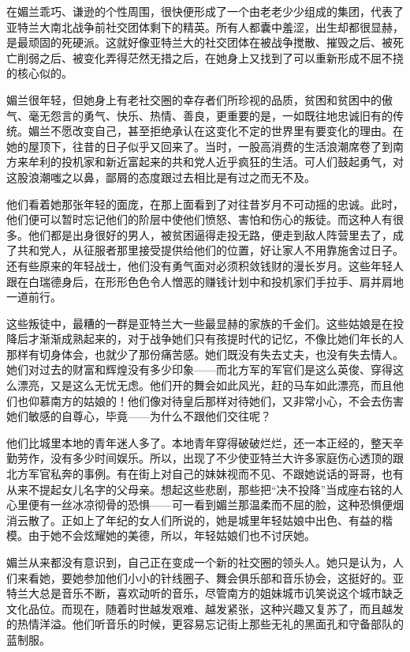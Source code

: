 \par 在媚兰乖巧、谦逊的个性周围，很快便形成了一个由老老少少组成的集团，代表了亚特兰大南北战争前社交团体剩下的精英。所有人都囊中羞涩，出生却都很显赫，是最顽固的死硬派。这就好像亚特兰大的社交团体在被战争搅散、摧毁之后、被死亡削弱之后、被变化弄得茫然无措之后，在她身上又找到了可以重新形成不屈不挠的核心似的。
\par 媚兰很年轻，但她身上有老社交圈的幸存者们所珍视的品质，贫困和贫困中的傲气、毫无怨言的勇气、快乐、热情、善良，更重要的是，一如既往地忠诚旧有的传统。媚兰不愿改变自己，甚至拒绝承认在这变化不定的世界里有要变化的理由。在她的屋顶下，往昔的日子似乎又回来了。当时，一股高消费的生活浪潮席卷了到南方来牟利的投机家和新近富起来的共和党人近乎疯狂的生活。可人们鼓起勇气，对这股浪潮嗤之以鼻，鄙屑的态度跟过去相比是有过之而无不及。
\par 他们看着她那张年轻的面庞，在那上面看到了对往昔岁月不可动摇的忠诚。此时，他们便可以暂时忘记他们的阶层中使他们愤怒、害怕和伤心的叛徒。而这种人有很多。他们都是出身很好的男人，被贫困逼得走投无路，便走到敌人阵营里去了，成了共和党人，从征服者那里接受提供给他们的位置，好让家人不用靠施舍过日子。还有些原来的年轻战士，他们没有勇气面对必须积敛钱财的漫长岁月。这些年轻人跟在白瑞德身后，在形形色色令人憎恶的赚钱计划中和投机家们手拉手、肩并肩地一道前行。
\par 这些叛徒中，最糟的一群是亚特兰大一些最显赫的家族的千金们。这些姑娘是在投降后才渐渐成熟起来的，对于战争她们只有孩提时代的记忆，不像比她们年长的人那样有切身体会，也就少了那份痛苦感。她们既没有失去丈夫，也没有失去情人。她们对过去的财富和辉煌没有多少印象——而北方军的军官们是这么英俊、穿得这么漂亮，又是这么无忧无虑。他们开的舞会如此风光，赶的马车如此漂亮，而且他们也仰慕南方的姑娘的！他们像对待皇后那样对待她们，又非常小心，不会去伤害她们敏感的自尊心，毕竟——为什么不跟他们交往呢？
\par 他们比城里本地的青年迷人多了。本地青年穿得破破烂烂，还一本正经的，整天辛勤劳作，没有多少时间娱乐。所以，出现了不少使亚特兰大许多家庭伤心透顶的跟北方军官私奔的事例。有在街上对自己的妹妹视而不见、不跟她说话的哥哥，也有从来不提起女儿名字的父母亲。想起这些悲剧，那些把“决不投降”当成座右铭的人心里便有一丝冰凉彻骨的恐惧——可一看到媚兰那温柔而不屈的脸，这种恐惧便烟消云散了。正如上了年纪的女人们所说的，她是城里年轻姑娘中出色、有益的楷模。由于她不会炫耀她的美德，所以，年轻姑娘们也不讨厌她。
\par 媚兰从来都没有意识到，自己正在变成一个新的社交圈的领头人。她只是认为，人们来看她，要她参加他们小小的针线圈子、舞会俱乐部和音乐协会，这挺好的。亚特兰大总是音乐不断，喜欢动听的音乐，尽管南方的姐妹城市讥笑说这个城市缺乏文化品位。而现在，随着时世越发艰难、越发紧张，这种兴趣又复苏了，而且越发的热情洋溢。他们听音乐的时候，更容易忘记街上那些无礼的黑面孔和守备部队的蓝制服。
